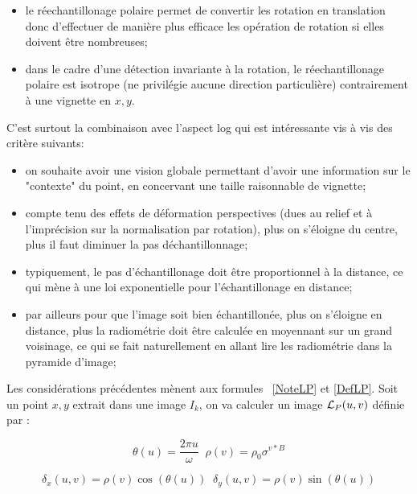 \begin{itemize}
   \item le  r\'eechantillonage polaire permet de convertir les rotation en translation donc
        d'effectuer de mani\`ere plus efficace les op\'eration de rotation si elles doivent \^etre
        nombreuses;
   \item dans le cadre d'une d\'etection invariante \`a la rotation, le  r\'eechantillonage polaire
        est isotrope (ne privil\'egie aucune direction particuli\`ere) contrairement \`a une vignette en $x,y$.
\end{itemize}

C'est surtout la combinaison avec l'aspect  log qui est int\'eressante vis  \`a vis des crit\`ere suivants:

\begin{itemize}
   \item on souhaite avoir une vision globale permettant d'avoir une information sur le "contexte"  du 
         point, en concervant une taille raisonnable de  vignette;

   \item compte tenu des effets de d\'eformation perspectives (dues au relief et \`a l'impr\'ecision sur la
         normalisation par rotation), plus on s'\'eloigne du centre, plus il faut diminuer la pas d\'echantillonnage;

   \item typiquement, le pas d'\'echantillonage doit \^etre  proportionnel \`a la distance, ce qui m\`ene
         \`a une loi exponentielle pour l'\'echantillonage en distance;

   \item par ailleurs pour que l'image soit bien \'echantillon\'ee, plus on s'\'eloigne en distance, plus la 
         radiom\'etrie doit \^etre calcul\'ee en moyennant sur un grand voisinage, ce qui se fait naturellement
         en allant lire les radiom\'etrie dans la pyramide d'image;
\end{itemize}


Les consid\'erations pr\'ec\'edentes m\`enent aux formules  ~\ref{NoteLP} et  \ref{DefLP}.
Soit un point $x,y$ extrait dans une image $I_k$, on
va calculer un image ${\mathcal L_P}(u,v)$ d\'efinie par :


\begin{equation}
    \theta(u) = \frac{2\pi u}{\omega} \;\; \rho(v)= \rho_0 \sigma^{v*B} \label{NoteLP}
\end{equation}

\begin{equation}
    \delta_x(u,v) =  \rho(v) \cos(\theta(u))  \; \;   \delta_y(u,v) =  \rho(v) \sin(\theta(u))  \label{XYLP}
\end{equation}


